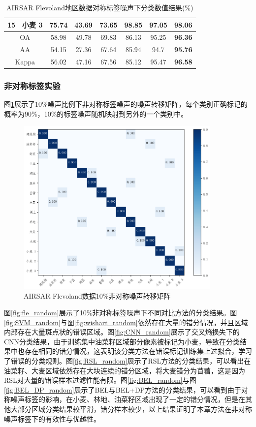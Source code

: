 \begin{table}[ht!]
\begin{tabular}{cccccccc}
        15                        & 小麦 3  & 75.74 & 43.69   & 73.65 & \textbf{98.85} & 97.05          & 98.06          \\
        \midrule[0.75bp]
        \multicolumn{2}{c}{OA}    & 58.98 & 49.78 & 69.83   & 86.13 & 95.25          & \textbf{96.36}                  \\
        \multicolumn{2}{c}{AA}    & 54.15 & 27.36 & 67.64   & 85.94 & 94.7           & \textbf{95.76}                  \\
        \multicolumn{2}{c}{Kappa} & 56.02 & 47.16 & 67.56   & 85.12 & 95.47          & \textbf{96.58}                  \\
        \bottomrule[1.5bp]
    \end{tabular}
    \caption{AIRSAR Flevoland地区数据对称标签噪声下分类数值结果(\%)}
    \label{tab:fle_res_4}
\end{table}

\subsubsection{非对称标签实验}
图\ref{fig:fle_noise_random}展示了10\%噪声比例下非对称标签噪声的噪声转移矩阵，每个类别正确标记的概率为90\%，10\%的标签噪声随机映射到另外的一个类别中。
\begin{figure}[ht!]
    \centering
    \includegraphics[width=10.04cm]{pic/chapter4/fle/noise_random.png}
    \caption{AIRSAR Flevoland数据10\%非对称噪声转移矩阵}
    \label{fig:fle_noise_random}
\end{figure}

图\ref{fig:fle_random}展示了10\%非对称标签噪声下不同对比方法的分类结果。图\ref{fig:SVM_random}与图\ref{fig:wishart_random}依然存在大量的错分情况，并且区域内部存在大量斑点状的错误区域。图\ref{fig:CNN_random}展示了交叉熵损失下的CNN分类结果，由于训练集中油菜籽区域部分像素被标记为小麦，导致在分类结果中也存在相同的错分情况，这表明该分类方法在错误标记训练集上过拟合，学习了错误的分类规则。图\ref{fig:RSL_random}展示了RSL方法的分类结果，可以看出在油菜籽、大麦区域依然存在大块连续的错分区域，将大麦错分为苜蓿，这是因为RSL对大量的错误样本过滤性能有限。图\ref{fig:BEL_random}与图\ref{fig:BEL_DP_random}展示了BEL与BEL+DP方法的分类结果，可以看到由于对称噪声标签的影响，在小麦、林地、油菜籽区域出现了一定的错分情况，但是在其他大部分区域分类结果较平滑，错分样本较少，以上结果证明了本章方法在非对称噪声标签下的有效性与优越性。


